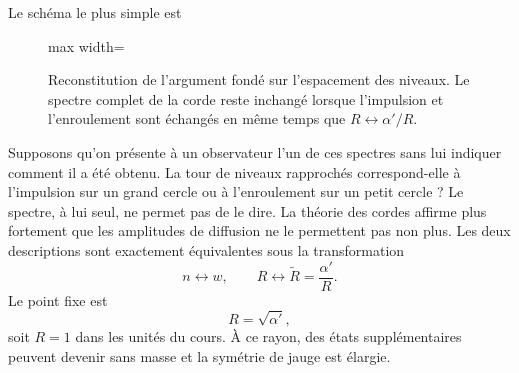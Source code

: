 Le schéma le plus simple est
\begin{figure}[H]
  \centering
  \begin{adjustbox}{max width=\linewidth}
  \end{adjustbox}
  \caption{Reconstitution de l’argument fondé sur l’espacement des niveaux. Le spectre complet de la corde reste inchangé lorsque l’impulsion et l’enroulement sont échangés en même temps que \(R\leftrightarrow\alpha'/R\).}
  \label{fig:l10-dual-spectra-redraw}
\end{figure}

Supposons qu’on présente à un observateur l’un de ces spectres sans lui indiquer comment il a été obtenu. La tour de niveaux rapprochés correspond-elle à l’impulsion sur un grand cercle ou à l’enroulement sur un petit cercle ? Le spectre, à lui seul, ne permet pas de le dire. La théorie des cordes affirme plus fortement que les amplitudes de diffusion ne le permettent pas non plus. Les deux descriptions sont exactement équivalentes sous la transformation
\begin{equation}
  n\longleftrightarrow w,
  \qquad
  R\longleftrightarrow \widetilde R=\frac{\alpha'}{R}.
  \label{eq:l10-radius-duality}
\end{equation}
Le point fixe est
\begin{equation}
  R=\sqrt{\alpha'},
  \label{eq:l10-self-dual-radius}
\end{equation}soit \(R=1\) dans les unités du cours. À ce rayon, des états supplémentaires peuvent devenir sans masse et la symétrie de jauge est élargie.

